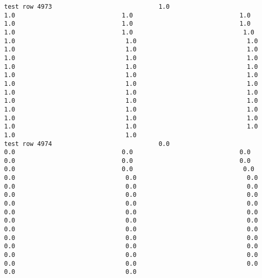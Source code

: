 \documentclass[11pt]{article}
\begin{document}
\begin{verbatim}
test row 4973                             1.0                             1.0                             1.0                             1.0                             1.0                             1.0                             1.0                             1.0                             1.0                              1.0                              1.0                              1.0                              1.0                              1.0                              1.0                              1.0                              1.0                              1.0                              1.0                              1.0                              1.0                              1.0                              1.0                              1.0                              1.0                              1.0                              1.0                              1.0                              1.0                              1.0                              1.0                              1.0                              1.0                              1.0                              1.0                              1.0                              1.0                              1.0                              1.0                              1.0                              1.0                              1.0                              1.0                              1.0                              1.0
test row 4974                             0.0                             0.0                             0.0                             0.0                             0.0                             0.0                             0.0                             0.0                             0.0                              0.0                              0.0                              0.0                              0.0                              0.0                              0.0                              0.0                              0.0                              0.0                              0.0                              0.0                              0.0                              0.0                              0.0                              0.0                              0.0                              0.0                              0.0                              0.0                              0.0                              0.0                              0.0                              0.0                              0.0                              0.0                              0.0                              0.0                              0.0                              0.0                              0.0                              0.0                              0.0                              0.0                              0.0                              0.0                              0.0

\end{verbatim}
\end{document}
